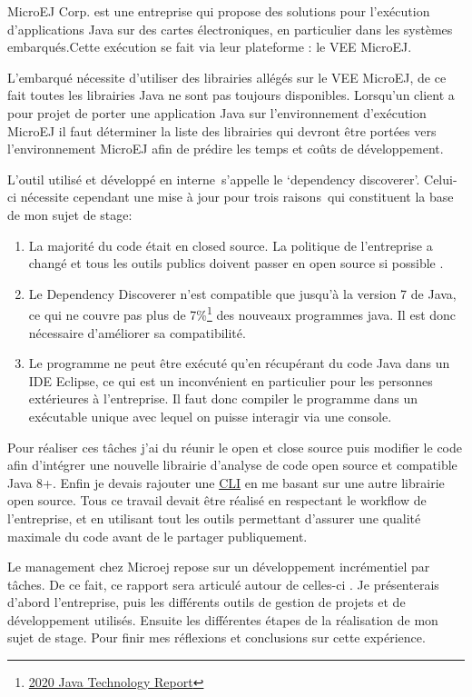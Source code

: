 \documentclass[french,a4paper,12pt]{report}
\begin{document}
MicroEJ Corp. est une entreprise qui propose des solutions pour  l’exécution d’applications Java sur des cartes électroniques, en particulier dans les systèmes embarqués.Cette exécution se fait via leur plateforme : le VEE MicroEJ.

L'embarqué nécessite d’utiliser des librairies allégés sur le VEE MicroEJ, de ce fait toutes les librairies Java ne sont pas toujours disponibles. Lorsqu’un client a pour projet de porter une application Java sur l’environnement d’exécution MicroEJ il faut déterminer la liste des librairies qui devront être portées vers l’environnement MicroEJ afin de prédire les temps et coûts de développement.

L’outil utilisé et développé en interne s’appelle le ‘dependency discoverer’. Celui-ci nécessite cependant une mise à jour pour trois raisons qui constituent la base de mon sujet de stage:

\begin{enumerate}
\item  La majorité du code était en closed source. La politique de l’entreprise a changé et tous les outils publics doivent passer en open source si possible .
\item Le Dependency Discoverer n’est compatible que jusqu’à la version 7 de Java, ce qui ne couvre pas plus de 7\%\footnote{\href{https://www.jrebel.com/blog/2020-java-technology-report}{2020 Java Technology Report}} des nouveaux programmes java. Il est donc nécessaire d’améliorer sa compatibilité. 
\item  Le programme ne peut être exécuté qu’en récupérant du code Java dans un IDE Eclipse, ce qui est un inconvénient en particulier pour les personnes extérieures à l’entreprise. Il faut donc compiler le programme dans un exécutable unique avec lequel on puisse interagir via une console.
\end{enumerate}

Pour réaliser ces tâches j’ai du réunir le open et close source puis modifier le code afin d’intégrer une nouvelle librairie d’analyse de code open source et compatible Java 8+. Enfin je devais rajouter une \hyperlink{CLI}{CLI} en me basant sur une autre librairie open source.
Tous ce travail devait être réalisé en respectant le workflow de l’entreprise, et en utilisant tout les outils permettant d’assurer une qualité maximale du code avant de le partager publiquement.

Le management chez Microej repose sur un développement incrémentiel par tâches. De ce fait, ce rapport sera articulé autour de celles-ci . Je présenterais d’abord l’entreprise, puis les différents outils de gestion de projets et de développement utilisés. Ensuite les différentes étapes de la réalisation de mon sujet de stage. Pour finir mes réflexions et conclusions sur cette expérience. 
\end{document}
